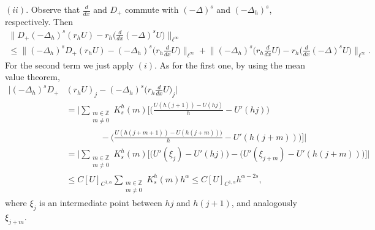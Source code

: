 \documentclass[a4paper,11pt,reqno]{amsart}
\newcommand{\Z}{\mathbb{Z}}
\theoremstyle{definition}
\numberwithin{equation}{section}
\begin{document}
\noindent$(ii)$. Observe that
$\frac{d}{dx}$ and $D_+$ commute with $(-\Delta)^s$ and $(-\Delta_h)^s$, respectively. Then
\begin{multline*}
\big\|D_+(-\Delta_h)^s (r_h U)- r_h\big(\tfrac{d}{dx}(-\Delta)^s U\big) \big\|_{\ell^\infty} \\
\le  \big\|(-\Delta_h)^s D_+(r_h U) - (-\Delta_h)^s \big(r_h \tfrac{d}{dx}U\big) \big\|_{\ell^\infty}
+ \big\| (-\Delta_h)^s \big(r_h \tfrac{d}{dx}U\big) - r_h\big(\tfrac{d}{dx}(-\Delta)^s U\big) \big\|_{\ell^\infty}.
\end{multline*}
For the second term we just apply $(i)$. As for the first one, by using the mean value theorem,
\begin{align*}
\big| (-\Delta_h)^s D_+&(r_h U)_j- (-\Delta_h)^s  \big(r_h \tfrac{d}{dx}U \big)_j \big| \\
&= \bigg|\sum_{\substack{m\in \Z\\m\neq 0}} K^h_s(m) \bigg[ \bigg( \frac{U(h(j+1))- U(hj)}{h} - U'(hj) \bigg) \\
&\qquad\qquad-\bigg(\frac{U(h(j+m+1))- U(h(j+m)))}{h}- U'(h(j+m))\bigg)\bigg]\bigg| \\
&= \bigg|\sum_{\substack{m\in \Z\\m\neq 0}} K^h_s(m) \bigg[\big(U'(\xi_j)-U'(hj)\big) -
\big( U'(\xi_{j+m})- U'(h(j+m)) \big)\bigg]\bigg| \\
&\le C[U]_{C^{1,\alpha}}\sum_{\substack{m\in \Z\\m\neq 0}} K^h_s(m)  h^{\alpha} \le C[U]_{C^{1,\alpha}}h^{\alpha-2s},
\end{align*}
where $\xi_j$ is an intermediate point between $hj$ and $h(j+1)$, and analogously~$\xi_{j+m}$.
\end{document}
